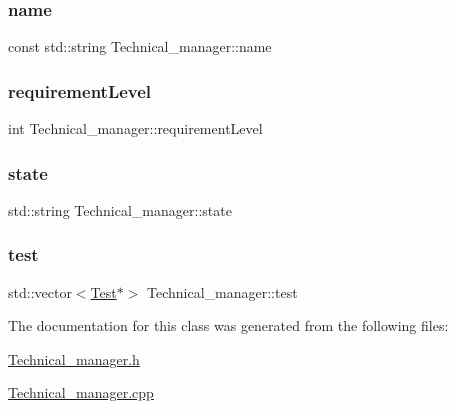 \hypertarget{class_technical__manager_a614ced849b0c26387b0d2fbb03a9a457}{}\label{class_technical__manager_a614ced849b0c26387b0d2fbb03a9a457} 
\subsubsection{\texorpdfstring{name}{name}}
{\footnotesize\ttfamily const std\+::string Technical\+\_\+manager\+::name\hspace{0.3cm}{\ttfamily [private]}}

\hypertarget{class_technical__manager_a86c6df435e9fb69acccbf1a8bdc22088}{}\label{class_technical__manager_a86c6df435e9fb69acccbf1a8bdc22088} 
\subsubsection{\texorpdfstring{requirement\+Level}{requirementLevel}}
{\footnotesize\ttfamily int Technical\+\_\+manager\+::requirement\+Level\hspace{0.3cm}{\ttfamily [private]}}

\hypertarget{class_technical__manager_a94e93641fd9eb15afba421e2d79ebfce}{}\label{class_technical__manager_a94e93641fd9eb15afba421e2d79ebfce} 
\subsubsection{\texorpdfstring{state}{state}}
{\footnotesize\ttfamily std\+::string Technical\+\_\+manager\+::state\hspace{0.3cm}{\ttfamily [private]}}

\hypertarget{class_technical__manager_a4bb774e21944be05309197d10dcba54e}{}\label{class_technical__manager_a4bb774e21944be05309197d10dcba54e} 
\subsubsection{\texorpdfstring{test}{test}}
{\footnotesize\ttfamily std\+::vector$<$\hyperlink{class_test}{Test}$\ast$$>$ Technical\+\_\+manager\+::test}



The documentation for this class was generated from the following files\+:\begin{DoxyCompactItemize}
\item 
\hyperlink{_technical__manager_8h}{Technical\+\_\+manager.\+h}\item 
\hyperlink{_technical__manager_8cpp}{Technical\+\_\+manager.\+cpp}\end{DoxyCompactItemize}

